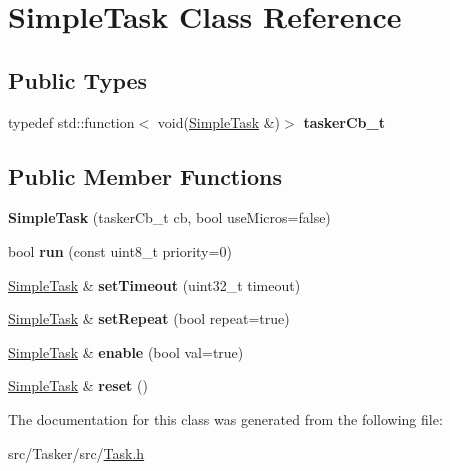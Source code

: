 \hypertarget{class_simple_task}{}\section{Simple\+Task Class Reference}
\label{class_simple_task}
\subsection*{Public Types}
\begin{DoxyCompactItemize}
\item 
\mbox{\label{class_simple_task_a26b575f2615e0e7e9214f8924d2afa16}} 
typedef std\+::function$<$ void(\hyperlink{class_simple_task}{Simple\+Task} \&)$>$ {\bfseries tasker\+Cb\+\_\+t}
\end{DoxyCompactItemize}
\subsection*{Public Member Functions}
\begin{DoxyCompactItemize}
\item 
\mbox{\label{class_simple_task_a64e20a96ac8a8a1e76de199890974818}} 
{\bfseries Simple\+Task} (tasker\+Cb\+\_\+t cb, bool use\+Micros=false)
\item 
\mbox{\label{class_simple_task_ac33dade916a8fc5c7050e1bdd793a396}} 
bool {\bfseries run} (const uint8\+\_\+t priority=0)
\item 
\mbox{\label{class_simple_task_a89a52e8151b087c1feb733a5799e76cb}} 
\hyperlink{class_simple_task}{Simple\+Task} \& {\bfseries set\+Timeout} (uint32\+\_\+t timeout)
\item 
\mbox{\label{class_simple_task_ad86b716df71dd331df49294932a35a66}} 
\hyperlink{class_simple_task}{Simple\+Task} \& {\bfseries set\+Repeat} (bool repeat=true)
\item 
\mbox{\label{class_simple_task_acc38025a5a829da2c9df2720bb512c38}} 
\hyperlink{class_simple_task}{Simple\+Task} \& {\bfseries enable} (bool val=true)
\item 
\mbox{\label{class_simple_task_a7578873e52df9667d22523ea7fecab7e}} 
\hyperlink{class_simple_task}{Simple\+Task} \& {\bfseries reset} ()
\end{DoxyCompactItemize}


The documentation for this class was generated from the following file\+:\begin{DoxyCompactItemize}
\item 
src/\+Tasker/src/\hyperlink{_task_8h}{Task.\+h}\end{DoxyCompactItemize}
